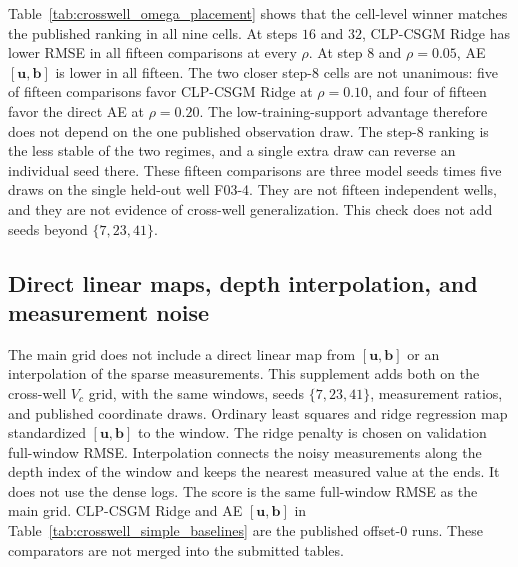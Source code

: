 Table~\ref{tab:crosswell_omega_placement} shows that the cell-level winner
matches the published ranking in all nine cells. At steps $16$ and $32$,
CLP-CSGM Ridge has lower RMSE in all fifteen comparisons at every $\rho$.
At step $8$ and $\rho=0.05$, AE $[\boldsymbol{u},\boldsymbol{b}]$ is lower in
all fifteen. The two closer step-$8$ cells are not unanimous: five of fifteen
comparisons favor CLP-CSGM Ridge at $\rho=0.10$, and four of fifteen favor
the direct AE at $\rho=0.20$. The low-training-support advantage therefore
does not depend on the one published observation draw. The step-$8$ ranking is
the less stable of the two regimes, and a single extra draw can reverse an
individual seed there. These fifteen comparisons are three model seeds times
five draws on the single held-out well F03-4. They are not fifteen independent
wells, and they are not evidence of cross-well generalization. This check does
not add seeds beyond $\{7,23,41\}$.

\subsection{Direct linear maps, depth interpolation, and measurement noise}
\label{app:crosswell_simple_baselines}

The main grid does not include a direct linear map from
$[\boldsymbol{u},\boldsymbol{b}]$ or an interpolation of the sparse
measurements. This supplement adds both on the cross-well $V_c$ grid, with
the same windows, seeds $\{7,23,41\}$, measurement ratios, and published
coordinate draws. Ordinary least squares and ridge regression map
standardized $[\boldsymbol{u},\boldsymbol{b}]$ to the window. The ridge
penalty is chosen on validation full-window RMSE. Interpolation connects the
noisy measurements along the depth index of the window and keeps the nearest
measured value at the ends. It does not use the dense logs. The score is the
same full-window RMSE as the main grid. CLP-CSGM Ridge and AE
$[\boldsymbol{u},\boldsymbol{b}]$ in
Table~\ref{tab:crosswell_simple_baselines} are the published offset-$0$ runs.
These comparators are not merged into the submitted tables.

\begin{table}[htbp]
  \centering
  \caption{Cross-well full-window RMSE at the published noise standard
  deviation $0.01$. Values are means over seeds $\{7,23,41\}$.
  Linear $[u,b]$ is ordinary least squares and Ridge direct is
  validation-selected ridge, both from $[\boldsymbol{u},\boldsymbol{b}]$ to
  the window. Interpolation uses only the sparse measurements.
  The lowest value in every cell is interpolation.}
  \label{tab:crosswell_simple_baselines}
  \small
\end{table}

